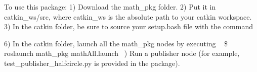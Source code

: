 To use this package\+: 1) Download the math\+\_\+pkg folder. 2) Put it in {\ttfamily catkin\+\_\+ws/src}, where {\ttfamily catkin\+\_\+ws} is the absolute path to your catkin workspace. 3) In the catkin folder, be sure to source your setup.\+bash file with the command ~\newline
 
\begin{DoxyCode}{0}
\DoxyCodeLine{ \{\$\}}
\end{DoxyCode}



\begin{DoxyCode}{0}
\DoxyCodeLine{ \{\$\}}
\end{DoxyCode}


6) In the catkin folder, launch all the math\+\_\+pkg nodes by executing ~\newline
 {\ttfamily \$ roslaunch math\+\_\+pkg math\+All.\+launch} ~) Run a publisher node (for example, {\ttfamily test\+\_\+publisher\+\_\+halfcircle.\+py} is provided in the package). 